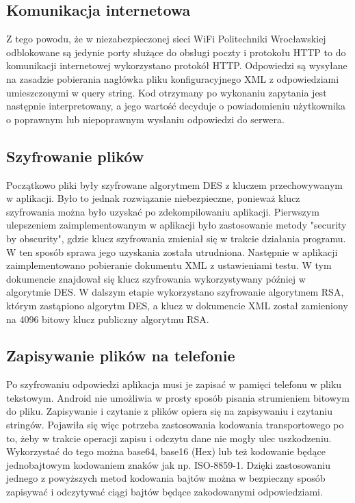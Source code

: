\documentclass[eng]{mgr}
\begin{document}
			\subsection{Komunikacja internetowa}
			
			Z tego powodu, że w niezabezpieczonej sieci WiFi Politechniki Wrocławskiej odblokowane są jedynie porty służące do obsługi poczty i protokołu HTTP to do komunikacji internetowej wykorzystano protokół HTTP. Odpowiedzi są wysyłane na zasadzie pobierania nagłówka pliku konfiguracyjnego XML z odpowiedziami umieszczonymi w query string. Kod otrzymany po wykonaniu zapytania jest następnie interpretowany, a jego wartość decyduje o powiadomieniu użytkownika o poprawnym lub niepoprawnym wysłaniu odpowiedzi do serwera.
		
			\subsection{Szyfrowanie plików}
		
			Początkowo pliki były szyfrowane algorytmem DES z kluczem przechowywanym w aplikacji. Było to jednak rozwiązanie niebezpieczne, ponieważ klucz szyfrowania można było uzyskać po zdekompilowaniu aplikacji. Pierwszym ulepszeniem zaimplementowanym w aplikacji było zastosowanie metody "security by obscurity", gdzie klucz szyfrowania zmieniał się w trakcie działania programu. W ten sposób sprawa jego uzyskania została utrudniona. Następnie w aplikacji zaimplementowano pobieranie dokumentu XML z ustawieniami testu. W tym dokumencie znajdował się klucz szyfrowania wykorzystywany później w algorytmie DES. W dalszym etapie wykorzystano szyfrowanie algorytmem RSA, którym zastąpiono algorytm DES, a klucz w dokumencie XML został zamieniony na 4096 bitowy klucz publiczny algorytmu RSA.
			
			\subsection{Zapisywanie plików na telefonie}
			
			Po szyfrowaniu odpowiedzi aplikacja musi je zapisać w pamięci telefonu w pliku tekstowym. Android nie umożliwia w prosty sposób pisania strumieniem bitowym do pliku. Zapisywanie i czytanie z plików opiera się na zapisywaniu i czytaniu stringów. Pojawiła się więc potrzeba zastosowania kodowania transportowego po to, żeby w trakcie operacji zapisu i odczytu dane nie mogły ulec uszkodzeniu. Wykorzystać do tego można base64, base16 (Hex) lub też kodowanie będące jednobajtowym kodowaniem znaków jak np. ISO-8859-1. Dzięki zastosowaniu jednego z powyższych metod kodowania bajtów można w bezpieczny sposób zapisywać i odczytywać ciągi bajtów będące zakodowanymi odpowiedziami.
		
\end{document}
